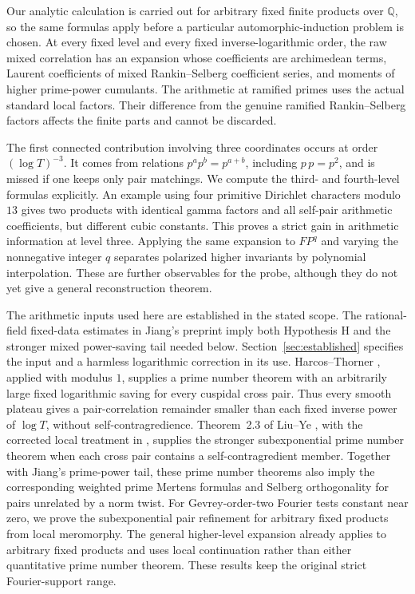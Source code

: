 \documentclass[11pt]{article}
\numberwithin{equation}{section}
\theoremstyle{remark}
\newcommand{\Q}{\mathbb Q}
\begin{document}
Our analytic calculation is carried out for arbitrary fixed finite
products over $\Q$, so the same formulas apply before a particular
automorphic-induction problem is chosen. At every fixed level and
every fixed inverse-logarithmic order, the raw mixed correlation has
an expansion whose coefficients are archimedean terms, Laurent
coefficients of mixed Rankin--Selberg coefficient series, and moments
of higher prime-power cumulants. The arithmetic at ramified primes
uses the actual standard local factors. Their difference from the
genuine ramified Rankin--Selberg factors affects the finite parts and
cannot be discarded.

The first connected contribution involving three coordinates occurs
at order $(\log T)^{-3}$. It comes from relations
$p^a p^b=p^{a+b}$, including $p\,p=p^2$, and is missed if one keeps
only pair matchings. We compute the third- and fourth-level formulas
explicitly. An example using four primitive Dirichlet characters
modulo $13$ gives two products with identical gamma factors and all
self-pair arithmetic coefficients, but different cubic constants.
This proves a strict gain in arithmetic information at level three.
Applying the same expansion to $FP^q$ and varying the nonnegative
integer $q$ separates polarized higher invariants by polynomial
interpolation. These are further observables for the probe, although
they do not yet give a general reconstruction theorem.

The arithmetic inputs used here are established in the stated scope.
The rational-field fixed-data estimates in Jiang's preprint
\cite{Jiang} imply both Hypothesis H and the stronger mixed
power-saving tail needed below. Section~\ref{sec:established}
specifies the input and a harmless logarithmic correction in its use.
Harcos--Thorner \cite[Theorem 2.1]{HT}, applied with modulus $1$,
supplies a prime number theorem with an arbitrarily large fixed
logarithmic saving for every cuspidal cross pair. Thus every smooth
plateau gives a pair-correlation remainder smaller than each fixed
inverse power of $\log T$, without self-contragredience. Theorem~2.3
of Liu--Ye \cite{LY07}, with the corrected local treatment in
\cite{Ycorr}, supplies the stronger subexponential prime number
theorem when each cross pair contains a self-contragredient member.
Together with Jiang's prime-power tail, these prime number theorems
also imply the corresponding weighted prime Mertens formulas and
Selberg orthogonality for pairs unrelated by a norm twist.
For Gevrey-order-two Fourier tests constant near zero, we prove the
subexponential pair refinement for arbitrary fixed products from
local meromorphy. The general higher-level expansion already applies
to arbitrary fixed products and uses local continuation rather than
either quantitative prime number theorem. These results keep the
original strict Fourier-support range.
\end{document}
